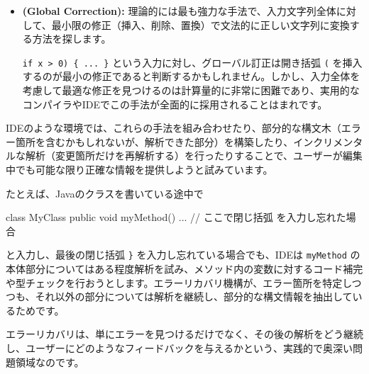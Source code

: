 \begin{itemize}
  Yaccのようなツールでは、\texttt{error}
  トークンを使ってエラー規則を定義できます。

\begin{codescreen}{}
statement: IF '(' expr ')' statement
         | IF error ')' statement {
             yyerror("Missing opening parenthesis in if statement");
           }
         | /* ... other rules ... */
         ;
\end{codescreen}

  この例では、\texttt{if} の後に開き括弧 \texttt{(} がない場合に
  \texttt{error}
  トークンがマッチし、エラーメッセージを出力しつつ、\texttt{)}
  以降の解析を継続しようとします。多くのエラーパターンを網羅しようとすると文法が複雑になりますが、特定のエラーに対しては効果的です。

\item
  \textbf{\sffamily (Global Correction):}
  理論的には最も強力な手法で、入力文字列全体に対して、最小限の修正（挿入、削除、置換）で文法的に正しい文字列に変換する方法を探します。

  \texttt{if\ x\ \textgreater{}\ 0)\ \{\ ...\ \}}
  という入力に対し、グローバル訂正は開き括弧 \texttt{(}
  を挿入するのが最小の修正であると判断するかもしれません。しかし、入力全体を考慮して最適な修正を見つけるのは計算量的に非常に困難であり、実用的なコンパイラやIDEでこの手法が全面的に採用されることはまれです。
\end{itemize}

IDEのような環境では、これらの手法を組み合わせたり、部分的な構文木（エラー箇所を含むかもしれないが、解析できた部分）を構築したり、インクリメンタルな解析（変更箇所だけを再解析する）を行ったりすることで、ユーザーが編集中でも可能な限り正確な情報を提供しようと試みています。

たとえば、Javaのクラスを書いている途中で

\begin{codescreen}{}
class MyClass { 
  public void myMethod() { 
    ... 
  }
// ここで閉じ括弧 } を入力し忘れた場合
\end{codescreen}

\noindent と入力し、最後の閉じ括弧 \texttt{\}} を入力し忘れている場合でも、IDEは
\texttt{myMethod}
の本体部分についてはある程度解析を試み、メソッド内の変数に対するコード補完や型チェックを行おうとします。エラーリカバリ機構が、エラー箇所を特定しつつも、それ以外の部分については解析を継続し、部分的な構文情報を抽出しているためです。

エラーリカバリは、単にエラーを見つけるだけでなく、その後の解析をどう継続し、ユーザーにどのようなフィードバックを与えるかという、実践的で奥深い問題領域なのです。

